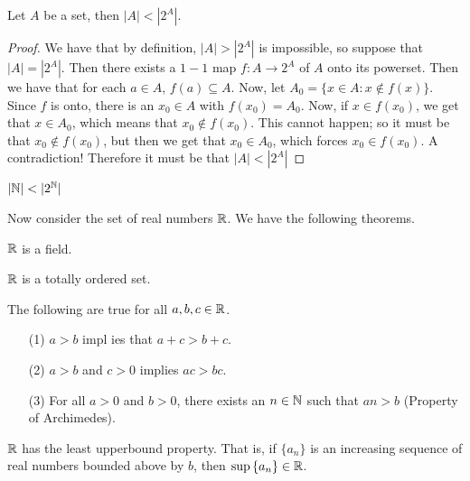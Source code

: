 \begin{theorem}\label{}
    Let $A$ be a set, then  $|A|<|2^A|$.
\end{theorem}
\begin{proof}
    We have that by definition, $|A|>|2^A|$ is impossible, so suppose that
    $|A|=|2^A|$. Then there exists a $1-1$ map  $f:A \rightarrow 2^A$ of $A$
    onto its powerset. Then we have that for each  $a \in A$,  $f(a) \subseteq
    A$. Now, let $A_0=\{x \in A : x \notin f(x)\}$. Since $f$ is onto, there is
    an  $x_0 \in A$ with $f(x_0)=A_0$. Now, if $x \in f(x_0)$, we get that $x
    \in A_0$, which means that $x_0 \notin f(x_0)$. This cannot happen; so it
    must be that $x_0 \notin f(x_0)$, but then we get that $x_0 \in A_0$, which
    forces $x_0 \in f(x_0)$. A contradiction! Therefore it must be that
    $|A|<|2^A|$
\end{proof}

\begin{example}\label{}
    $|\N|<|2^\N|$
\end{example}

Now consider the set of real numbers $\mathbb{R}$. We have the following theorems.

\begin{theorem}\label{}
    $\mathbb{R}$ is a field.
\end{theorem}

\begin{theorem}\label{}
    $\mathbb{R}$ is a totally ordered set.
\end{theorem}
\begin{corollary}
    The following are true for all $a,b,c \in \mathbb{R}$.
    \begin{enumerate}
        \item[(1)] $a>b$ impl ies that $a+c>b+c$.

        \item[(2)] $a>b$ and  $c>0$ implies  $ac>bc$.

        \item[(3)] For all $a>0$ and  $b>0$, there exists an  $n \in \mathbb{N}$ such
            that  $an>b$  (Property of Archimedes).
    \end{enumerate}
\end{corollary}

\begin{theorem}\label{}
    $\mathbb{R}$ has the least upperbound property. That is, if  $\{a_n\}$ is an
    increasing sequence of real numbers bounded above by $b$, then  $\sup{\{a_n\}}
    \in \mathbb{R}$.
\end{theorem}
